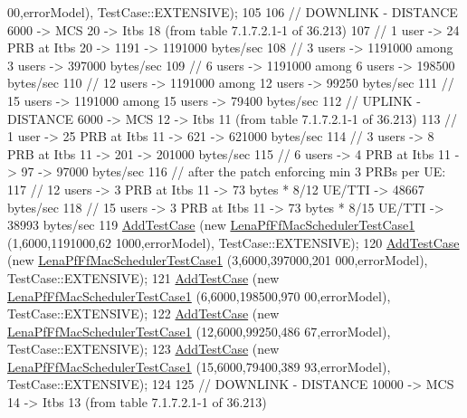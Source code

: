 \begin{DoxyCode}
      00,errorModel), TestCase::EXTENSIVE);
105   
106   \textcolor{comment}{// DOWNLINK - DISTANCE 6000 -> MCS 20 -> Itbs 18 (from table 7.1.7.2.1-1 of 36.213)}
107   \textcolor{comment}{// 1 user -> 24 PRB at Itbs 20 -> 1191 -> 1191000 bytes/sec}
108   \textcolor{comment}{// 3 users -> 1191000 among 3 users -> 397000 bytes/sec}
109   \textcolor{comment}{// 6 users -> 1191000 among 6 users -> 198500 bytes/sec}
110   \textcolor{comment}{// 12 users -> 1191000 among 12 users -> 99250 bytes/sec}
111   \textcolor{comment}{// 15 users -> 1191000 among 15 users -> 79400 bytes/sec}
112   \textcolor{comment}{// UPLINK - DISTANCE 6000 -> MCS 12 -> Itbs 11 (from table 7.1.7.2.1-1 of 36.213)}
113   \textcolor{comment}{// 1 user -> 25 PRB at Itbs 11 -> 621 -> 621000 bytes/sec}
114   \textcolor{comment}{// 3 users -> 8 PRB at Itbs 11 -> 201 -> 201000 bytes/sec}
115   \textcolor{comment}{// 6 users -> 4 PRB at Itbs 11 -> 97 -> 97000 bytes/sec}
116   \textcolor{comment}{// after the patch enforcing min 3 PRBs per UE:}
117   \textcolor{comment}{// 12 users -> 3 PRB at Itbs 11 -> 73 bytes * 8/12 UE/TTI -> 48667 bytes/sec}
118   \textcolor{comment}{// 15 users -> 3 PRB at Itbs 11 -> 73 bytes * 8/15 UE/TTI -> 38993 bytes/sec}
119   \hyperlink{classns3_1_1TestCase_a3718088e3eefd5d6454569d2e0ddd835}{AddTestCase} (\textcolor{keyword}{new} \hyperlink{classLenaPfFfMacSchedulerTestCase1}{LenaPfFfMacSchedulerTestCase1} (1,6000,1191000,62
      1000,errorModel), TestCase::EXTENSIVE);
120   \hyperlink{classns3_1_1TestCase_a3718088e3eefd5d6454569d2e0ddd835}{AddTestCase} (\textcolor{keyword}{new} \hyperlink{classLenaPfFfMacSchedulerTestCase1}{LenaPfFfMacSchedulerTestCase1} (3,6000,397000,201
      000,errorModel), TestCase::EXTENSIVE);
121   \hyperlink{classns3_1_1TestCase_a3718088e3eefd5d6454569d2e0ddd835}{AddTestCase} (\textcolor{keyword}{new} \hyperlink{classLenaPfFfMacSchedulerTestCase1}{LenaPfFfMacSchedulerTestCase1} (6,6000,198500,970
      00,errorModel), TestCase::EXTENSIVE);
122   \hyperlink{classns3_1_1TestCase_a3718088e3eefd5d6454569d2e0ddd835}{AddTestCase} (\textcolor{keyword}{new} \hyperlink{classLenaPfFfMacSchedulerTestCase1}{LenaPfFfMacSchedulerTestCase1} (12,6000,99250,486
      67,errorModel), TestCase::EXTENSIVE);
123   \hyperlink{classns3_1_1TestCase_a3718088e3eefd5d6454569d2e0ddd835}{AddTestCase} (\textcolor{keyword}{new} \hyperlink{classLenaPfFfMacSchedulerTestCase1}{LenaPfFfMacSchedulerTestCase1} (15,6000,79400,389
      93,errorModel), TestCase::EXTENSIVE);
124 
125   \textcolor{comment}{// DOWNLINK - DISTANCE 10000 -> MCS 14 -> Itbs 13 (from table 7.1.7.2.1-1 of 36.213)}

\end{DoxyCode}
